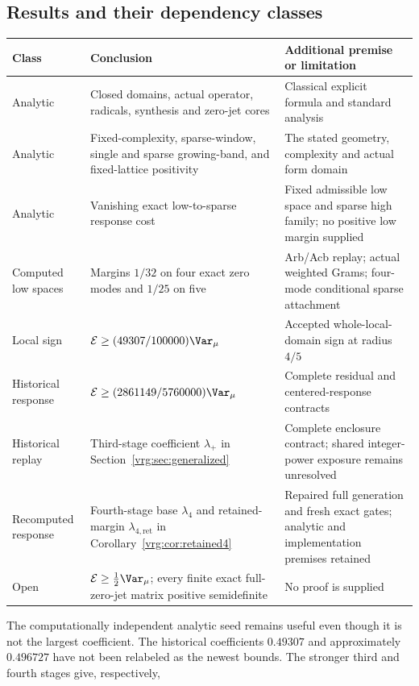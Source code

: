 \documentclass[11pt,a4paper]{article}
\numberwithin{equation}{section}
\theoremstyle{definition}\newtheorem{definition}[theorem]{Definition}
\theoremstyle{remark}\newtheorem{remark}[theorem]{Remark}
\newcommand{\E}{\mathcal E}\newcommand{\D}{\mathcal D}
\begin{document}
\subsection{Results and their dependency classes}
\begin{center}\small
\begin{tabular}{@{}>{\raggedright\arraybackslash}p{}>{\raggedright\arraybackslash}p{}>{\raggedright\arraybackslash}p{}@{}}
\toprule Class & Conclusion & Additional premise or limitation\\\midrule
Analytic & Closed domains, actual operator, radicals, synthesis and zero-jet cores & Classical explicit formula and standard analysis\\[3pt]
Analytic & Fixed-complexity, sparse-window, single and sparse growing-band, and fixed-lattice positivity & The stated geometry, complexity and actual form domain\\[3pt]
Analytic & Vanishing exact low-to-sparse response cost & Fixed admissible low space and sparse high family; no positive low margin supplied\\[3pt]
Computed low spaces & Margins $1/32$ on four exact zero modes and $1/25$ on five & Arb/Acb replay; actual weighted Grams; four-mode conditional sparse attachment\\[3pt]
Local sign & $\E\ge(49307/100000)\Var_\mu$ & Accepted whole-local-domain sign at radius $4/5$\\[3pt]
Historical response & $\E\ge(2861149/5760000)\Var_\mu$ & Complete residual and centered-response contracts\\[3pt]
Historical replay & Third-stage coefficient $\lambda_+$ in Section~\ref{vrg:sec:generalized} & Complete enclosure contract; shared integer-power exposure remains unresolved\\[3pt]
Recomputed response & Fourth-stage base $\lambda_4$ and retained-margin $\lambda_{4,\mathrm{ret}}$ in Corollary~\ref{vrg:cor:retained4} & Repaired full generation and fresh exact gates; analytic and implementation premises retained\\[3pt]
Open & $\E\ge\tfrac12\Var_\mu$; every finite exact full-zero-jet matrix positive semidefinite & No proof is supplied\\\bottomrule
\end{tabular}
\end{center}
The computationally independent analytic seed remains useful even though it is not the largest coefficient. The historical coefficients $0.49307$ and approximately $0.496727$ have not been relabeled as the newest bounds. The stronger third and fourth stages give, respectively,
\end{document}
